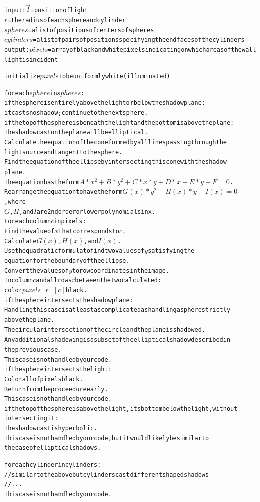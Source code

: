 \documentclass[10pt]{article}
\begin{document}
\begin{alltt}
input: \(\vec{l}\) = position of light
       \(r\) = the radius of each sphere and cylinder
       \(spheres\) = a list of positions of centers of spheres
       \(cylinders\) = a list of pairs of positions specifying the end faces of the cylinders
output: \(pixels\) = array of black and white pixels indicating on which areas of the wall
              light is incident

initialize \(pixels\) to be uniformly white (illuminated)

for each \(sphere\) in \(spheres\):
  if the sphere is entirely above the light or below the shadow plane:
    it casts no shadow; continue to the next sphere.
  if the top of the sphere is beneath the light and the bottom is above the plane:
    The shadow cast on the plane will be elliptical.
    Calculate the equation of the cone formed by all lines passing through the
        light source and tangent to the sphere.
    Find the equation of the ellipse by intersecting this cone with the shadow
        plane.
    The equation has the form \(A*x^2 + B*y^2 + C*x*y + D*x + E*y + F = 0\).
    Rearrange the equation to have the form \(G(x)*y^2 + H(x)*y + I(x) = 0\), where
        \(G\), \(H\), and \(I\) are 2nd order or lower polynomials in x.
    For each column \(c\) in pixels:
      Find the value of \(x\) that corresponds to \(c\).
      Calculate \(G(x)\), \(H(x)\), and \(I(x)\).
      Use the quadratic formula to find two values of \(y\) satisfying the
          equation for the boundary of the ellipse.
      Convert the values of \(y\) to row coordinates in the image.
      In column \(c\) and all rows \(r\) between the two calculated:
        color \(pixels[r][c]\) black.
  if the sphere intersects the shadow plane:
    Handling this case is at least as complicated as handling a sphere strictly
        above the plane.
    The circular intersection of the circle and the plane is shadowed.
    Any additional shadowing is a subset of the elliptical shadow described in
        the previous case.
    This case is not handled by our code.
  if the sphere intersects the light:
    Color all of pixels black.
    Return from the proceedure early.
    This case is not handled by our code.
  if the top of the sphere is above the light, its bottom below the light, without
      intersecting it:
    The shadow cast is hyperbolic.
    This case is not handled by our code, but it would likely be similar to
        the case of elliptical shadows.

for each cylinder in cylinders:
  //similar to the above but cylinders cast different shaped shadows
  // ...
  This case is not handled by our code.
\end{alltt}
\end{document}
